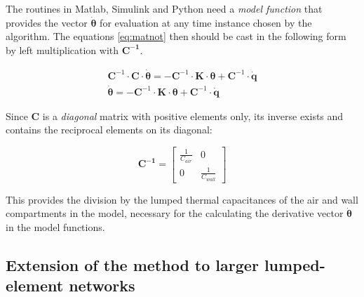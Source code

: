 The routines in Matlab, Simulink and Python need a \emph{model function} that provides the vector $\boldsymbol{\dot{\theta}}$ for evaluation at any time instance chosen by the algorithm. The equations \eqref{eq:matnot} then should be cast in the following form by left multiplication with $\mathbf{C^{-1}}$.

\begin{subequations}
	\label{eq:matnot_ivp}
	\begin{align}
		\mathbf{C}^{-1} \cdot \mathbf{C} \cdot \boldsymbol{\dot{\theta}} = - \mathbf{C}^{-1} \cdot \mathbf{K} \cdot \boldsymbol{\theta} + \mathbf{C}^{-1} \cdot \mathbf{\dot{q}} \\ 
        \boldsymbol{\dot{\theta}} = - \mathbf{C}^{-1} \cdot \mathbf{K} \cdot \boldsymbol{\theta} + \mathbf{C}^{-1} \cdot \mathbf{\dot{q}}
	\end{align}
\end{subequations}

Since $\mathbf{C}$ is a \emph{diagonal} matrix with positive elements only, its inverse exists and contains the reciprocal elements on its diagonal:

\begin{equation}
	\mathbf{C^{-1}} =
	\begin{bmatrix}
		\frac{1}{C_{air}} & 0 \\
		0 &  \frac{1}{C_{wall}}
	\end{bmatrix}
\end{equation}

This provides the division by the lumped thermal capacitances of the air and wall compartments in the model, necessary for the calculating the derivative vector $\boldsymbol{\dot{\theta}}$ in the model functions. 

\subsection{Extension of the method to larger lumped-element networks}
